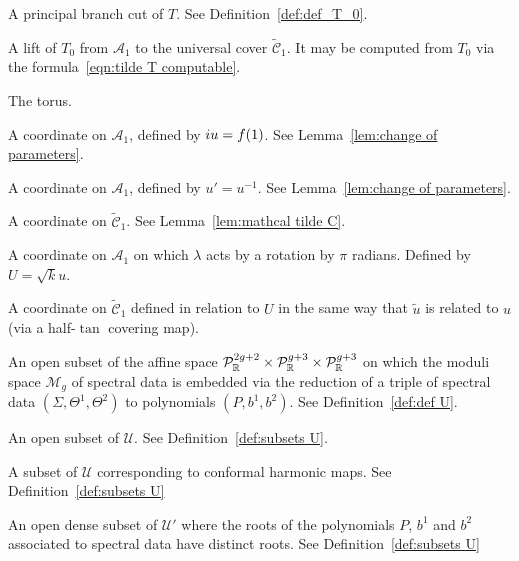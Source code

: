 \begin{description}[align=right]
\item[$T_0$] A principal branch cut of $T$. See Definition~\ref{def:def_T_0}.

\item[$\tilde{T}$] A lift of $T_0$ from $\mathcal{A}_1$ to the universal cover $\mathcal{\tilde{C}}_1$. It may be computed from $T_0$ via the formula~\eqref{eqn:tilde T computable}.

\item[$\mathbb{T}^2$] The torus.

\item[$u$] A coordinate on $\mathcal{A}_1$, defined by $i u = f(1)$. See Lemma~\ref{lem:change of parameters}.

\item[$u'$] A coordinate on $\mathcal{A}_1$, defined by $u' = u^{-1}$. See Lemma~\ref{lem:change of parameters}.

\item[$\tilde{u}$] A coordinate on $\mathcal{\tilde{C}}_1$. See Lemma~\ref{lem:mathcal tilde C}.

\item[$U$] A coordinate on $\mathcal{A}_1$ on which $λ$ acts by a rotation by $π$ radians. Defined by $U=\sqrt{k} u$.

\item[$\tilde{U}$] A coordinate on $\mathcal{\tilde{C}}_1$ defined in relation to $U$ in the same way that $\tilde{u}$ is related to $u$ (via a half-$\tan$ covering map).

\item[$\mathcal{U}$] An open subset of the affine space $\mathcal{P}^{2g+2}_\R\times \mathcal{P}^{g+3}_\R\times\mathcal{P}^{g+3}_\R$ on which the moduli space $\mathcal{M}_g$ of spectral data is embedded via the reduction of a triple of spectral data $(Σ,Θ^1,Θ^2)$ to polynomials $(P,b^1,b^2)$. See Definition~\ref{def:def U}.

\item[$\mathcal{U}'$] An open subset of $\mathcal{U}$. See Definition~\ref{def:subsets U}.

\item[$\mathcal{U}''$] A subset of $\mathcal{U}$ corresponding to conformal harmonic maps. See Definition~\ref{def:subsets U}

\item[$\mathcal{U}^{(i)}$] An open dense subset of $\mathcal{U}'$ where the roots of the polynomials $P$, $b^1$ and $b^2$ associated to spectral data have distinct roots. See Definition~\ref{def:subsets U}


\end{description}
